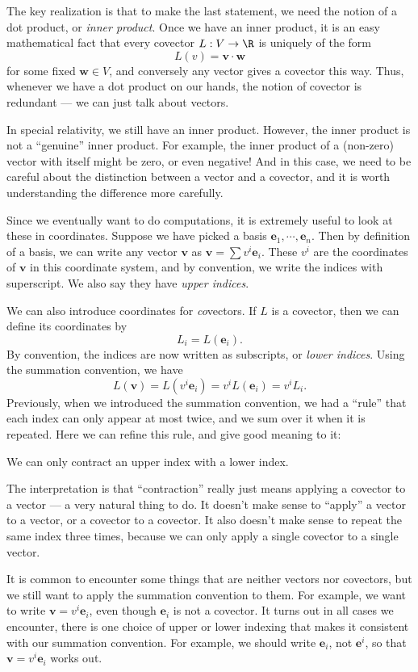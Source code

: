 \documentclass[a4paper]{article}
\begin{document}
The key realization is that to make the last statement, we need the notion of a dot product, or \emph{inner product}. Once we have an inner product, it is an easy mathematical fact that every covector $L: V \to \R$ is uniquely of the form
\[
  L(v) = \mathbf{v} \cdot \mathbf{w}
\]
for some fixed $\mathbf{w} \in V$, and conversely any vector gives a covector this way. Thus, whenever we have a dot product on our hands, the notion of covector is redundant --- we can just talk about vectors.

In special relativity, we still have an inner product. However, the inner product is not a ``genuine'' inner product. For example, the inner product of a (non-zero) vector with itself might be zero, or even negative! And in this case, we need to be careful about the distinction between a vector and a covector, and it is worth understanding the difference more carefully.

Since we eventually want to do computations, it is extremely useful to look at these in coordinates. Suppose we have picked a basis $\mathbf{e}_1, \cdots, \mathbf{e}_n$. Then by definition of a basis, we can write any vector $\mathbf{v}$ as $\mathbf{v} = \sum v^i \mathbf{e}_i$. These $v^i$ are the coordinates of $\mathbf{v}$ in this coordinate system, and by convention, we write the indices with superscript. We also say they have \emph{upper indices}.

We can also introduce coordinates for \emph{co}vectors. If $L$ is a covector, then we can define its coordinates by
\[
  L_i = L(\mathbf{e}_i).
\]
By convention, the indices are now written as subscripts, or \emph{lower indices}. Using the summation convention, we have
\[
  L(\mathbf{v}) = L(v^i \mathbf{e}_i) = v^i L(\mathbf{e}_i) = v^i L_i.
\]
Previously, when we introduced the summation convention, we had a ``rule'' that each index can only appear at most twice, and we sum over it when it is repeated. Here we can refine this rule, and give good meaning to it:
\begin{rrule}
  We can only contract an upper index with a lower index.
\end{rrule}
The interpretation is that ``contraction'' really just means applying a covector to a vector --- a very natural thing to do. It doesn't make sense to ``apply'' a vector to a vector, or a covector to a covector. It also doesn't make sense to repeat the same index three times, because we can only apply a single covector to a single vector.

It is common to encounter some things that are neither vectors nor covectors, but we still want to apply the summation convention to them. For example, we want to write $\mathbf{v} = v^i \mathbf{e}_i$, even though $\mathbf{e}_i$ is not a covector. It turns out in all cases we encounter, there is one choice of upper or lower indexing that makes it consistent with our summation convention. For example, we should write $\mathbf{e}_i$, not $\mathbf{e}^i$, so that $\mathbf{v} = v^i \mathbf{e}_i$ works out.
\end{document}
